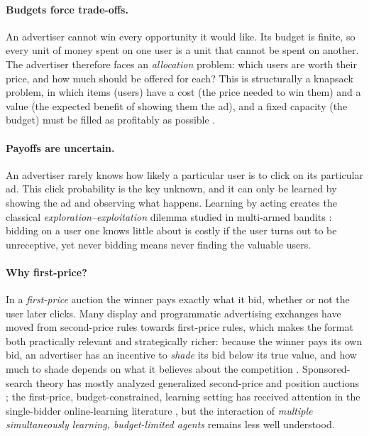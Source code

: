 \documentclass{article}
\theoremstyle{definition}
\theoremstyle{remark}
\begin{document}
\paragraph{Budgets force trade-offs.} An advertiser cannot win every opportunity it would like. Its budget is finite, so every unit of money spent on one user is a unit that cannot be spent on another. The advertiser therefore faces an \emph{allocation} problem: which users are worth their price, and how much should be offered for each? This is structurally a knapsack problem, in which items (users) have a cost (the price needed to win them) and a value (the expected benefit of showing them the ad), and a fixed capacity (the budget) must be filled as profitably as possible \citep{kellerer2004knapsack}.

\paragraph{Payoffs are uncertain.} An advertiser rarely knows how likely a particular user is to click on its particular ad. This click probability is the key unknown, and it can only be learned by showing the ad and observing what happens. Learning by acting creates the classical \emph{exploration--exploitation} dilemma studied in multi-armed bandits \citep{auer2002finite,slivkins2019introduction,lattimore2020bandit}: bidding on a user one knows little about is costly if the user turns out to be unreceptive, yet never bidding means never finding the valuable users.

\paragraph{Why first-price?} In a \emph{first-price} auction the winner pays exactly what it bid, whether or not the user later clicks. Many display and programmatic advertising exchanges have moved from second-price rules towards first-price rules, which makes the format both practically relevant and strategically richer: because the winner pays its own bid, an advertiser has an incentive to \emph{shade} its bid below its true value, and how much to shade depends on what it believes about the competition \citep{krishna2009auction,vickrey1961counterspeculation}. Sponsored-search theory has mostly analyzed generalized second-price and position auctions \citep{edelman2007internet,varian2007position}; the first-price, budget-constrained, learning setting has received attention in the single-bidder online-learning literature \citep{balseiro2019learning,han2020optimal}, but the interaction of \emph{multiple simultaneously learning, budget-limited agents} remains less well understood.
\end{document}

